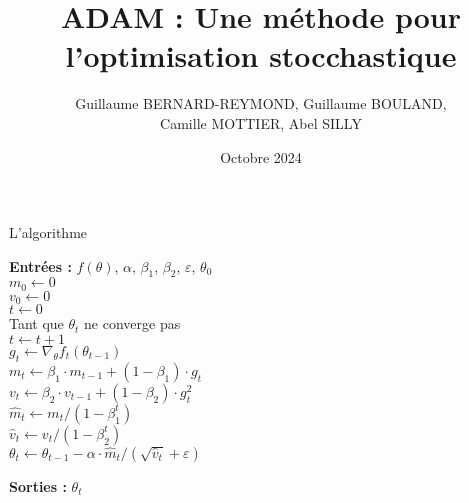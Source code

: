 \documentclass[11pt]{beamer}
\title{ADAM : Une méthode pour l'optimisation stocchastique}
\author{Guillaume BERNARD-REYMOND, Guillaume BOULAND,\\ Camille MOTTIER, Abel SILLY}
\date{Octobre 2024}
\begin{document}
\frame{\titlepage}

\begin{frame}{L'algorithme}

\textbf{Entrées :} $f(\theta)$, $\alpha$, $\beta_1$, $\beta_2$, $\varepsilon$, $\theta_0$\\
\hspace*{0.5cm}   $m_0\longleftarrow 0$ \\
\hspace*{0.5cm}  $v_0\longleftarrow 0$ \\  
\hspace*{0.5cm}  $t\longleftarrow 0$ \\
\hspace*{0.5cm}Tant que $\theta_t$ ne converge pas\\
   \hspace*{1.5cm} $t\longleftarrow t+1$\\
   \hspace*{1.5cm} $g_t \longleftarrow \nabla_{\theta}f_t(\theta_{t-1})$\\
  \hspace*{1.5cm}  $m_t \longleftarrow \beta_1\cdotp m_{t-1}+(1-\beta_1)\cdotp g_t$\\
   \hspace*{1.5cm} $v_t \longleftarrow \beta_2\cdotp v_{t-1}+(1-\beta_2)\cdotp g_t^2$\\
   \hspace*{1.5cm} $\widehat m_t \longleftarrow m_t/(1-\beta_1^t)$\\
   \hspace*{1.5cm} $\widehat v_t \longleftarrow v_t/(1-\beta_2^t)$\\
   \hspace*{1.5cm} $\theta_t \longleftarrow \theta_{t-1}-\alpha\cdotp \widehat m_t/(\sqrt{\widehat v_t}+\varepsilon)$
  
\hspace*{0.5cm} \textbf{Sorties :} $\theta_t$
\end{frame}
\end{document}
